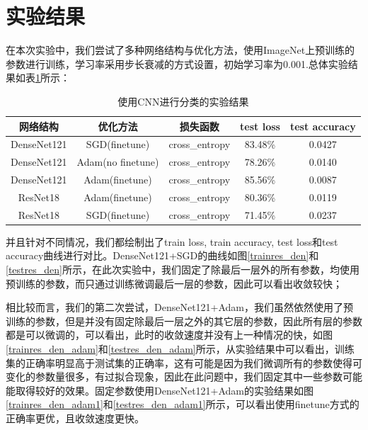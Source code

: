 \documentclass[cn]{elegantbook}
\begin{document}
\section{实验结果}
在本次实验中，我们尝试了多种网络结构与优化方法，使用ImageNet上预训练的参数进行训练，学习率采用步长衰减的方式设置，初始学习率为0.001.总体实验结果如表\ref{tab:res}所示：
\begin{table}[!h]
	\centering
	\caption{\label{tab:res}使用CNN进行分类的实验结果}
	\begin{tabular}{|c|c|c|c|c|}
		\hline
		网络结构 & 优化方法 & 损失函数 & test loss & test accuracy \\
		\hline
		DenseNet121 & SGD(finetune) & cross\_entropy & 83.48\% & 0.0427 \\
		\hline
		DenseNet121 & Adam(no finetune) & cross\_entropy & 78.26\% & 0.0140 \\
		\hline
		DenseNet121 & Adam(finetune) & cross\_entropy & {\color{red} 85.56\%} & {\color{red} 0.0087} \\
		\hline
		ResNet18 & Adam(finetune) & cross\_entropy & 80.36\% & 0.0119\\
		\hline
		ResNet18 & SGD(finetune) & cross\_entropy & 71.45\% & 0.0237\\
		\hline
	\end{tabular}
\end{table}

并且针对不同情况，我们都绘制出了train loss, train accuracy, test loss和test accuracy曲线进行对比。DenseNet121+SGD的曲线如图\ref{trainres_den}和\ref{testres_den}所示，在此次实验中，我们固定了除最后一层外的所有参数，均使用预训练的参数，而只通过训练微调最后一层的参数，因此可以看出收敛较快；

相比较而言，我们的第二次尝试，DenseNet121+Adam，我们虽然依然使用了预训练的参数，但是并没有固定除最后一层之外的其它层的参数，因此所有层的参数都是可以微调的，可以看出，此时的收敛速度并没有上一种情况的快，如图\ref{trainres_den_adam}和\ref{testres_den_adam}所示，从实验结果中可以看出，训练集的正确率明显高于测试集的正确率，这有可能是因为我们微调所有的参数使得可变化的参数量很多，有过拟合现象，因此在此问题中，我们固定其中一些参数可能能取得较好的效果。固定参数使用DenseNet121+Adam的实验结果如图\ref{trainres_den_adam1}和\ref{testres_den_adam1}所示，可以看出使用finetune方式的正确率更优，且收敛速度更快。
\end{document}
